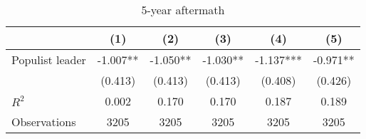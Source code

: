 \begin{table}[htbp]\centering
\def\sym#1{\ifmmode^{#1}\else\(^{#1}\)\fi}
\caption{5-year aftermath}
\begin{tabular}{l*{5}{c}}
\hline\hline
                    &\multicolumn{1}{c}{(1)}   &\multicolumn{1}{c}{(2)}   &\multicolumn{1}{c}{(3)}   &\multicolumn{1}{c}{(4)}   &\multicolumn{1}{c}{(5)}   \\
\hline
Populist leader     &      -1.007** &      -1.050** &      -1.030** &      -1.137***&      -0.971** \\
                    &     (0.413)   &     (0.413)   &     (0.413)   &     (0.408)   &     (0.426)   \\
\hline
\(R^{2}\)           &       0.002   &       0.170   &       0.170   &       0.187   &       0.189   \\
Observations        &        3205   &        3205   &        3205   &        3205   &        3205   \\
\hline\hline
\end{tabular}
\end{table}

